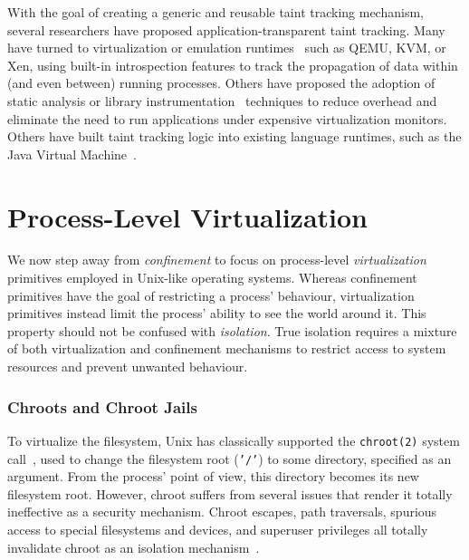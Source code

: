 With the goal of creating a generic and reusable taint tracking mechanism, several
researchers have proposed application-transparent taint tracking. Many have turned to
virtualization or emulation runtimes~\cite{ermolinskiy2010_towards, zavou2011_taint,
yin2007_panorama} such as QEMU, KVM, or Xen, using built-in introspection features to
track the propagation of data within (and even between) running processes. Others have
proposed the adoption of static analysis or library
instrumentation~\cite{zhu2011_taint_eraser, cheng2006_taint, clause2007_taint} techniques
to reduce overhead and eliminate the need to run applications under expensive
virtualization monitors. Others have built taint tracking logic into existing language
runtimes, such as the Java Virtual Machine~\cite{chin2009_efficient}.



\section{Process-Level Virtualization}%
\label{s:virtualization}

We now step away from \textit{confinement} to focus on process-level
\textit{virtualization} primitives employed in Unix-like operating systems. Whereas
confinement primitives have the goal of restricting a process' behaviour, virtualization
primitives instead limit the process' ability to see the world around it. This property
should not be confused with \textit{isolation}. True isolation requires a mixture of both
virtualization and confinement mechanisms to restrict access to system resources and
prevent unwanted behaviour.

\subsubsection*{Chroots and Chroot Jails}

To virtualize the filesystem, Unix has classically supported the \texttt{chroot(2)} system
call~\cite{mcfearin2011_chroot_jails}, used to change the filesystem root (\texttt{'/'})
to some directory, specified as an argument. From the process' point of view, this
directory becomes its new filesystem root. However, chroot suffers from several issues
that render it totally ineffective as a security mechanism. Chroot escapes, path
traversals, spurious access to special filesystems and devices, and superuser privileges
all totally invalidate chroot as an isolation mechanism~\cite{mcfearin2011_chroot_jails}.

